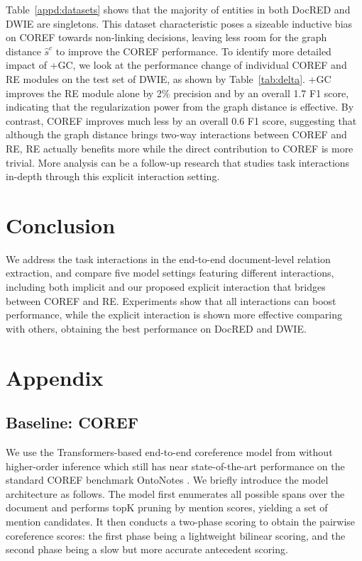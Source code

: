 \documentclass[11pt]{article}
\begin{document}
Table~\ref{appd:datasets} shows that the majority of entities in both DocRED and DWIE are singletons. This dataset characteristic poses a sizeable inductive bias on COREF towards non-linking decisions, leaving less room for the graph distance $\hat{s}^c$ to improve the COREF performance.
To identify more detailed impact of +GC, we look at the performance change of individual COREF and RE modules on the test set of DWIE, as shown by Table~\ref{tab:delta}.
+GC improves the RE module alone by 2\% precision and by an overall 1.7 F1 score, indicating that the regularization power from the graph distance is effective. By contrast, COREF improves much less by an overall 0.6 F1 score, suggesting that although the graph distance brings two-way interactions between COREF and RE, RE actually benefits more while the direct contribution to COREF is more trivial. More analysis can be a follow-up research that studies task interactions in-depth through this explicit interaction setting.
 \section{Conclusion}
\label{sec:conclusion}

We address the task interactions in the end-to-end document-level relation extraction, and compare five model settings featuring different interactions, including both implicit and our proposed explicit interaction that bridges between COREF and RE. Experiments show that all interactions can boost performance, while the explicit interaction is shown more effective comparing with others, obtaining the best performance on DocRED and DWIE.
 



\clearpage
\appendix
\section{Appendix}
\label{sec:appendix}

\subsection{Baseline: COREF}
\label{appd:baseline}

We use the Transformers-based end-to-end coreference model from \citet{lee-etal-2018-higher,joshi-etal-2019-bert} without higher-order inference \citep{xu-choi-2020-revealing} which still has near state-of-the-art performance on the standard COREF benchmark OntoNotes \citep{ontonotes}. We briefly introduce the model architecture as follows. The model first enumerates all possible spans over the document and performs topK pruning by mention scores, yielding a set of mention candidates. It then conducts a two-phase scoring to obtain the pairwise coreference scores: the first phase being a lightweight bilinear scoring, and the second phase being a slow but more accurate antecedent scoring.
\end{document}
